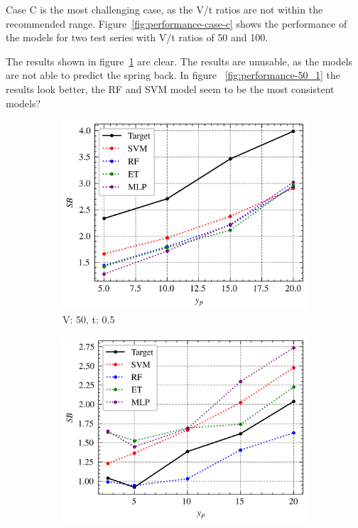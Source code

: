 Case C is the most challenging case, as the V/t ratios are not within the recommended range.
Figure~\ref{fig:performance-case-c} shows the performance of the models for two test series
with V/t ratios of 50 and 100.

The results shown in figure~\ref{fig:performance-50_0.5} are clear.
The results are unusable, as the models are not able to predict the spring back.
In figure ~\ref{fig:performance-50_1} the results look better, the \ac{RF} and \ac{SVM} model
seem to be the most consistent models?

\begin{figure}[H]
    \begin{tcolorbox}[arc=0pt,boxrule=0.5pt]
        \begin{subfigure}{0.5\textwidth}
            \includegraphics[width=\textwidth]{chap5/images/performance_50_0.5}
            \caption{V: 50, t: 0.5}
            \label{fig:performance-50_0.5}
        \end{subfigure}
        \hfill
        \begin{subfigure}{0.5\textwidth}
            \includegraphics[width=\textwidth]{chap5/images/performance_50_1}

\end{subfigure}
\end{tcolorbox}
\end{figure}
